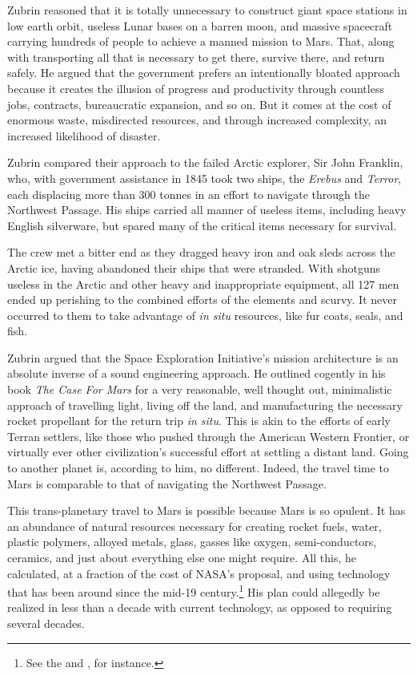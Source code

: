 Zubrin reasoned that it is totally unnecessary to construct giant space stations in low earth orbit, useless Lunar bases on a barren moon, and massive spacecraft carrying hundreds of people to achieve a manned mission to Mars. That, along with transporting all that is necessary to get there, survive there, and return safely. He argued that the government prefers an intentionally bloated approach because it creates the illusion of progress and productivity through countless jobs, contracts, bureaucratic expansion, and so on. But it comes at the cost of enormous waste, misdirected resources, and through increased complexity, an increased likelihood of disaster.

Zubrin compared their approach to the failed Arctic explorer, Sir John Franklin, who, with government assistance in 1845 took two ships, the {\it Erebus} and {\it Terror}, each displacing more than 300 tonnes in an effort to navigate through the Northwest Passage. His ships carried all manner of useless items, including heavy English silverware, but spared many of the critical items necessary for survival. 

The crew met a bitter end as they dragged heavy iron and oak sleds across the Arctic ice, having abandoned their ships that were stranded. With shotguns useless in the Arctic and other heavy and inappropriate equipment, all 127 men ended up perishing to the combined efforts of the elements and scurvy. It never occurred to them to take advantage of {\it in situ} resources, like fur coats, seals, and fish.

Zubrin argued that the Space Exploration Initiative's mission architecture is an absolute inverse of a sound engineering approach. He outlined cogently in his book {\it The Case For Mars} for a very reasonable, well thought out, minimalistic approach of travelling light, living off the land, and manufacturing the necessary rocket propellant for the return trip {\it in situ}. This is akin to the efforts of early Terran settlers, like those who pushed through the American Western Frontier, or virtually ever other civilization's successful effort at settling a distant land. Going to another planet is, according to him, no different. Indeed, the travel time to Mars is comparable to that of navigating the Northwest Passage.

This trans-planetary travel to Mars is possible because Mars is so opulent. It has an abundance of natural resources necessary for creating rocket fuels, water, plastic polymers, alloyed metals, glass, gasses like oxygen, semi-conductors, ceramics, and just about everything else one might require. All this, he calculated, at a fraction of the cost of NASA's proposal, and using technology that has been around since the mid-19 century.\footnote{See the  and , for instance.} His plan could allegedly be realized in less than a decade with current technology, as opposed to requiring several decades.

